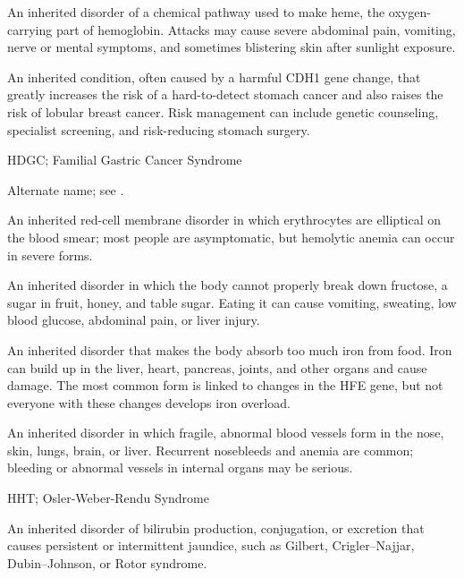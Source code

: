  An inherited disorder of a chemical pathway used to make heme, the oxygen-carrying part of hemoglobin. Attacks may cause severe abdominal pain, vomiting, nerve or mental symptoms, and sometimes blistering skin after sunlight exposure.

 An inherited condition, often caused by a harmful CDH1 gene change, that greatly increases the risk of a hard-to-detect stomach cancer and also raises the risk of lobular breast cancer. Risk management can include genetic counseling, specialist screening, and risk-reducing stomach surgery.

\synonyms
HDGC; Familial Gastric Cancer Syndrome

 Alternate name; see .

 An inherited red-cell membrane disorder in which erythrocytes are elliptical on the blood smear; most people are asymptomatic, but hemolytic anemia can occur in severe forms.

 An inherited disorder in which the body cannot properly break down fructose, a sugar in fruit, honey, and table sugar. Eating it can cause vomiting, sweating, low blood glucose, abdominal pain, or liver injury.

 An inherited disorder that makes the body absorb
too much iron from food. Iron can build up in the liver, heart, pancreas, joints, and
other organs and cause damage. The most common form is linked to changes in the HFE
gene, but not everyone with these changes develops iron overload.

 An inherited disorder in which fragile, abnormal blood vessels form in the nose, skin, lungs, brain, or liver. Recurrent nosebleeds and anemia are common; bleeding or abnormal vessels in internal organs may be serious.


\synonyms
HHT; Osler-Weber-Rendu Syndrome

 An inherited disorder of bilirubin production, conjugation, or excretion that causes persistent or intermittent jaundice, such as Gilbert, Crigler--Najjar, Dubin--Johnson, or Rotor syndrome.

